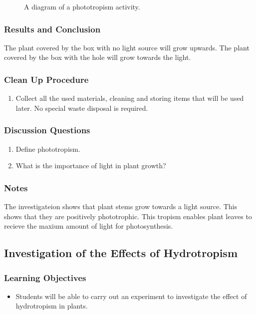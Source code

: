 \begin{figure}[h]
\begin{center}
\def\svgwidth{8cm}

\caption{A diagram of a phototropism activity.}
\label{fig:phototropism}
\end{center}
\end{figure}

\subsubsection*{Results and Conclusion}
The plant covered by the box with no light source will grow upwards. The plant covered by the box with the hole will grow towards the light.

\subsubsection*{Clean Up Procedure}
\begin{enumerate}
\item{Collect all the used materials, cleaning and storing items that will be used later. No special waste disposal is required.}
\end{enumerate}

\subsubsection*{Discussion Questions}
\begin{enumerate}
\item{Define phototropism.}
\item{What is the importance of light in plant growth?}
\end{enumerate}

\subsubsection*{Notes}
The investigateion shows that plant stems grow towards a light source.  This shows that they are positively phototrophic. This tropism enables plant leaves to recieve the maxium amount of light for photosynthesis.


\subsection{Investigation of the Effects of Hydrotropism}

\subsubsection*{Learning Objectives}
\begin{itemize}
\item{Students will be able to carry out an experiment to investigate the effect of hydrotropism in plants.}
\end{itemize}

